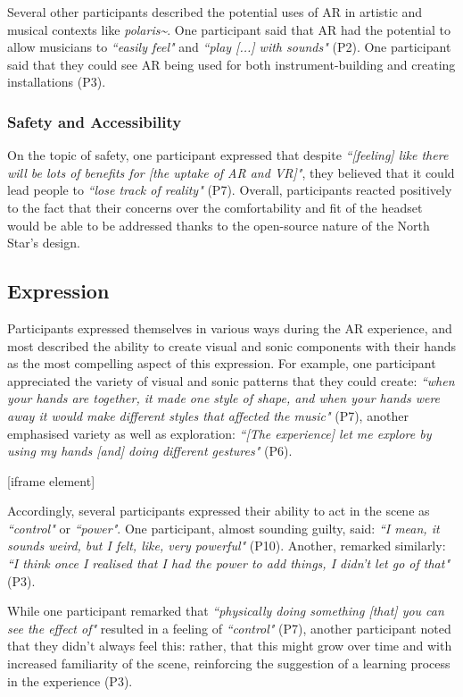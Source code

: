Several other participants described the potential uses of AR in artistic and musical contexts like \textit{polaris\textasciitilde{}}. One participant said that AR had the potential to allow musicians to \textit{``easily feel"} and \textit{``play [...] with sounds"} (P2). One participant said that they could see AR being used for both instrument-building and creating installations (P3).

\subsubsection{Safety and Accessibility}\label{sec: polaris-feedback-adoption-safety}
On the topic of safety, one participant expressed that despite \textit{``[feeling] like there will be lots of benefits for [the uptake of AR and VR]"}, they believed that it could lead people to \textit{``lose track of reality"} (P7). Overall, participants reacted positively to the fact that their concerns over the comfortability and fit of the headset would be able to be addressed thanks to the open-source nature of the North Star’s design.

\subsection{Expression}\label{sec: polaris-feedback-expression}
Participants expressed themselves in various ways during the AR experience, and most described the ability to create visual and sonic components with their hands as the most compelling aspect of this expression. For example, one participant appreciated the variety of visual and sonic patterns that they could create: \textit{``when your hands are together, it made one style of shape, and when your hands were away it would make different styles that affected the music"} (P7), another emphasised variety as well as exploration: \textit{``[The experience] let me explore by using my hands [and] doing different gestures"} (P6).

[iframe element]

Accordingly, several participants expressed their ability to act in the scene as \textit{``control"} or \textit{``power"}. One participant, almost sounding guilty, said: \textit{``I mean, it sounds weird, but I felt, like, very powerful"} (P10). Another, remarked similarly: \textit{``I think once I realised that I had the power to add things, I didn’t let go of that"} (P3).

While one participant remarked that \textit{``physically doing something [that] you can see the effect of"} resulted in a feeling of \textit{``control"} (P7), another participant noted that they didn’t always feel this: rather, that this might grow over time and with increased familiarity of the scene, reinforcing the suggestion of a learning process in the experience (P3).

